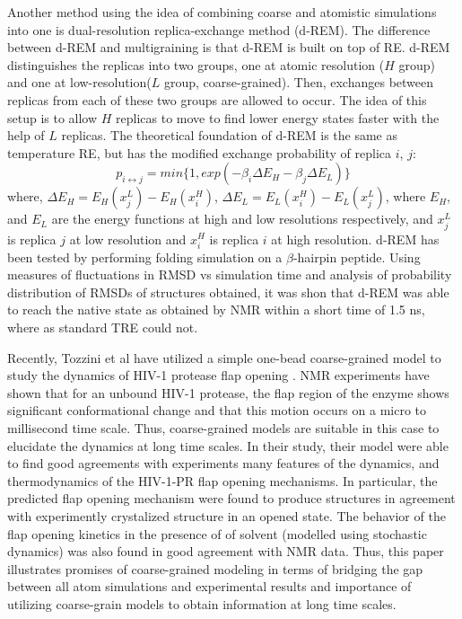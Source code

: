 \documentclass[12pt]{article}
\numberwithin{equation}{subsection}
\begin{document}
\begin{spacing}{1}
Another method using the idea of combining coarse and atomistic simulations into one is dual-resolution replica-exchange method (d-REM)\cite{drem}.  The difference between d-REM and multigraining is that d-REM is built on top of RE.  d-REM distinguishes the replicas into two groups, one at atomic resolution  ($H$ group) and one at low-resolution($L$ group, coarse-grained).  Then, exchanges between replicas from each of these two groups are allowed to occur. The idea of this setup is to allow $H$ replicas to move to find lower energy states faster with the help of $L$ replicas.  The theoretical foundation of d-REM is the same as temperature RE, but has the modified exchange probability of replica $i$, $j$:
\begin{equation}
p_{i\leftrightarrow j} = min\{1, exp(-\beta_i\Delta E_H - \beta_j\Delta E_L)\}
\end{equation}
where, $\Delta E_H = E_H(x_j^L) - E_H(x_i^H)$, $\Delta E_L = E_L(x_i^H) - E_L(x_j^L)$, where $E_H$, and $E_L$ are the energy functions at high and low resolutions respectively, and $x_j^L$ is replica $j$ at low resolution and $x_i^H$ is replica $i$ at high resolution. d-REM has been tested by performing folding simulation on a $\beta$-hairpin peptide. Using measures of fluctuations in RMSD vs simulation time and analysis of probability distribution of RMSDs of structures obtained, it was shon that d-REM was able to reach the native state as obtained by NMR within a short time of 1.5 ns, where as standard TRE could not.

Recently, Tozzini et al have utilized a simple one-bead coarse-grained model to study the dynamics of HIV-1 protease flap opening \cite{hiv1}. NMR experiments have shown that for an unbound HIV-1 protease, the flap region of the enzyme shows significant conformational change and that this motion occurs on a micro to millisecond time scale. Thus, coarse-grained models are suitable in this case to elucidate the dynamics at long time scales. In their study, their model were able to find good agreements with experiments many features of the dynamics, and thermodynamics of the HIV-1-PR flap opening mechanisms. In particular, the predicted flap opening mechanism were found to produce structures in agreement with experimently crystalized structure in an opened state.  The behavior of the flap opening kinetics in the presence of of solvent (modelled using stochastic dynamics) was also found in good agreement with NMR data.  Thus, this paper illustrates promises of coarse-grained modeling in terms of bridging the gap between all atom simulations and experimental results and importance of utilizing coarse-grain models to obtain information at long time scales.


\end{spacing}
\end{document}
